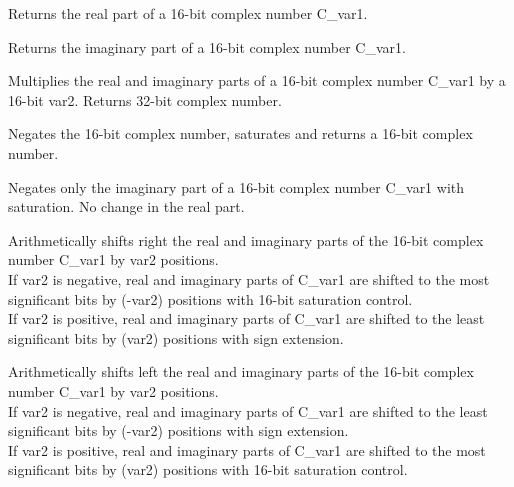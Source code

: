 
Returns the real part of a 16-bit complex number C\_var1.


Returns the imaginary part of a 16-bit complex number C\_var1.


Multiplies the real and imaginary parts of a 16-bit complex number C\_var1 by a 16-bit var2.
Returns 32-bit complex number.


Negates the 16-bit complex number, saturates and returns a 16-bit complex number.


Negates only the imaginary part of a 16-bit complex number C\_var1 with saturation.
No change in the real part.


Arithmetically shifts right the real and imaginary parts of the 16-bit complex number C\_var1 by var2 positions.\\
If var2 is negative, real and imaginary parts of C\_var1 are shifted to the most significant bits by (-var2) positions with 16-bit saturation control.\\
If var2 is positive, real and imaginary parts of C\_var1 are shifted to the least significant bits by (var2) positions with sign extension.


Arithmetically shifts left the real and imaginary parts of the 16-bit complex number C\_var1 by var2 positions.\\
If var2 is negative, real and imaginary parts of C\_var1 are shifted to the least significant bits by (-var2) positions with sign extension.\\
If var2 is positive, real and imaginary parts of C\_var1 are shifted to the most significant bits by (var2) positions with 16-bit saturation control.

